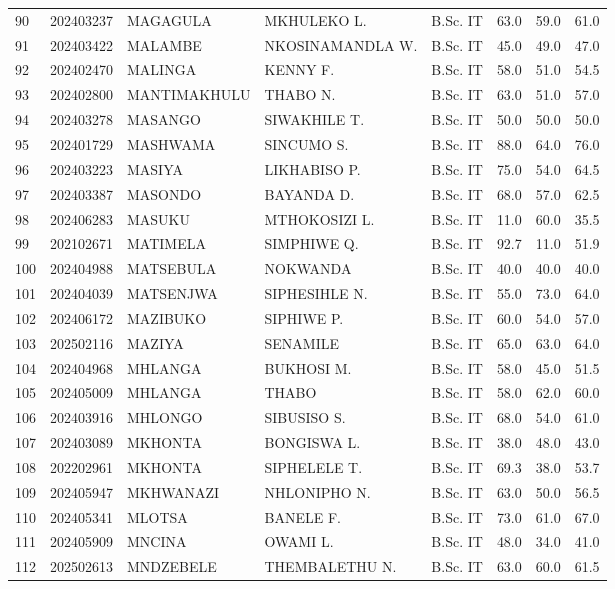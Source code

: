 \documentclass[12pt]{article}
\begin{document}
\begin{longtable}{@{}llllllll@{}}
90 & 202403237 & MAGAGULA & MKHULEKO L. & B.Sc. IT & 63.0 & 59.0 & 61.0 \\
91 & 202403422 & MALAMBE & NKOSINAMANDLA W. & B.Sc. IT & 45.0 & 49.0 & 47.0 \\
92 & 202402470 & MALINGA & KENNY F. & B.Sc. IT & 58.0 & 51.0 & 54.5 \\
93 & 202402800 & MANTIMAKHULU & THABO N. & B.Sc. IT & 63.0 & 51.0 & 57.0 \\
94 & 202403278 & MASANGO & SIWAKHILE T. & B.Sc. IT & 50.0 & 50.0 & 50.0 \\
95 & 202401729 & MASHWAMA & SINCUMO S. & B.Sc. IT & 88.0 & 64.0 & 76.0 \\
96 & 202403223 & MASIYA & LIKHABISO P. & B.Sc. IT & 75.0 & 54.0 & 64.5 \\
97 & 202403387 & MASONDO & BAYANDA D. & B.Sc. IT & 68.0 & 57.0 & 62.5 \\
98 & 202406283 & MASUKU & MTHOKOSIZI L. & B.Sc. IT & 11.0 & 60.0 & 35.5 \\
99 & 202102671 & MATIMELA & SIMPHIWE Q. & B.Sc. IT & 92.7 & 11.0 & 51.9 \\
100 & 202404988 & MATSEBULA & NOKWANDA & B.Sc. IT & 40.0 & 40.0 & 40.0 \\
101 & 202404039 & MATSENJWA & SIPHESIHLE N. & B.Sc. IT & 55.0 & 73.0 & 64.0 \\
102 & 202406172 & MAZIBUKO & SIPHIWE P. & B.Sc. IT & 60.0 & 54.0 & 57.0 \\
103 & 202502116 & MAZIYA & SENAMILE & B.Sc. IT & 65.0 & 63.0 & 64.0 \\
104 & 202404968 & MHLANGA & BUKHOSI M. & B.Sc. IT & 58.0 & 45.0 & 51.5 \\
105 & 202405009 & MHLANGA & THABO & B.Sc. IT & 58.0 & 62.0 & 60.0 \\
106 & 202403916 & MHLONGO & SIBUSISO S. & B.Sc. IT & 68.0 & 54.0 & 61.0 \\
107 & 202403089 & MKHONTA & BONGISWA L. & B.Sc. IT & 38.0 & 48.0 & 43.0 \\
108 & 202202961 & MKHONTA & SIPHELELE T. & B.Sc. IT & 69.3 & 38.0 & 53.7 \\
109 & 202405947 & MKHWANAZI & NHLONIPHO N. & B.Sc. IT & 63.0 & 50.0 & 56.5 \\
110 & 202405341 & MLOTSA & BANELE F. & B.Sc. IT & 73.0 & 61.0 & 67.0 \\
111 & 202405909 & MNCINA & OWAMI L. & B.Sc. IT & 48.0 & 34.0 & 41.0 \\
112 & 202502613 & MNDZEBELE & THEMBALETHU N. & B.Sc. IT & 63.0 & 60.0 & 61.5 \\

\end{longtable}
\end{document}
